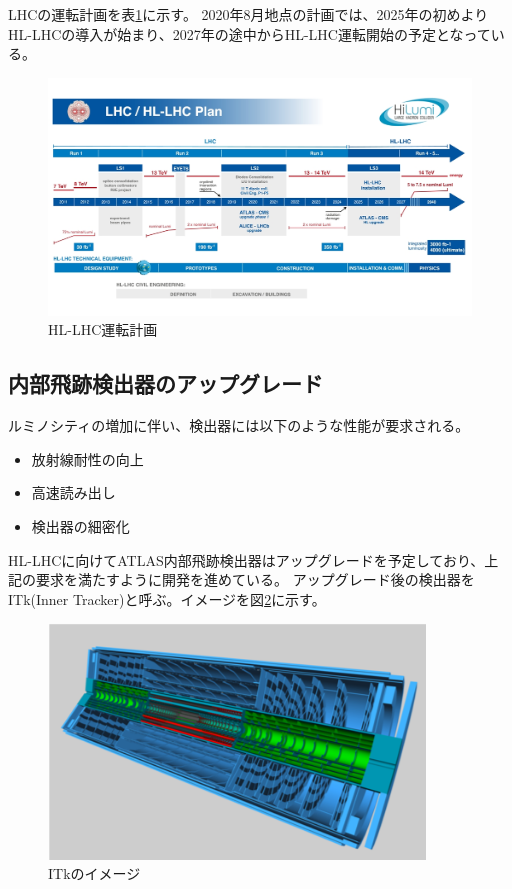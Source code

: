 LHCの運転計画を表\ref{hllhc_plan}に示す。
2020年8月地点の計画では、2025年の初めよりHL-LHCの導入が始まり、2027年の途中からHL-LHC運転開始の予定となっている。
\begin{figure}[bpt]\centering
\includegraphics[width=12cm]{hllhc_plan}
\caption[HL-LHC運転計画]{HL-LHC運転計画\cite{1-7}}
\label{hllhc_plan}
\end{figure}

\subsection{内部飛跡検出器のアップグレード}
ルミノシティの増加に伴い、検出器には以下のような性能が要求される。
\begin{itemize}
  \item 放射線耐性の向上
  \item 高速読み出し
  \item 検出器の細密化
\end{itemize}

HL-LHCに向けてATLAS内部飛跡検出器はアップグレードを予定しており、上記の要求を満たすように開発を進めている。
アップグレード後の検出器をITk(Inner Tracker)と呼ぶ。イメージを図\ref{itk_image}に示す。

\begin{figure}[bpt]\centering
\includegraphics[width=10cm]{itk_image}
\caption[ITkのイメージ]{ITkのイメージ\cite{1-3}}
\label{itk_image}
\end{figure}

